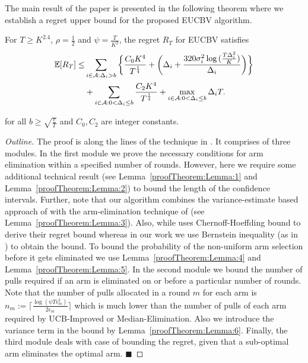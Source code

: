 The main result of the paper is presented in the following theorem where we establish a regret upper bound for the proposed EUCBV  algorithm. 
\begin{theorem}
\label{Result:Theorem:1}
For $T\geq K^{2.4}$, $\rho=\frac{1}{2}$ and $\psi=\frac{T}{K^2}$, the regret $R_T$ for EUCBV satisfies
\begin{align*}
\mathbb{E} [R_{T}] \leq &\sum\limits_{i\in \mathcal{A} :\Delta_{i} > b}\bigg\lbrace \dfrac{C_0 K^{4}}{T^{\frac{1}{4}}} + \bigg(\Delta_{i}+\dfrac{320\sigma_i^2\log{(\frac{T\Delta_{i}^{2}}{K})}}{\Delta_{i}}\bigg)\bigg \rbrace\\ 
  & +\sum\limits_{i\in \mathcal{A} :0 < \Delta_{i}\leq b} \dfrac{C_2 K^{4}}{T^{\frac{1}{4}}} + \max_{i\in \mathcal{A} :0 < \Delta_{i}\leq b}\Delta_{i}T.
\end{align*}

for all $b\geq\sqrt{\frac{e}{T}}$ and $C_0, C_2$ are integer constants. 
\end{theorem}

\begin{proof}[Outline]
The proof is along the lines of the technique in \citet{auer2010ucb}. It comprises of three modules. In the first module we prove the necessary conditions for arm elimination within a specified number of rounds. However, here we require some additional technical result (see Lemma~\ref{proofTheorem:Lemma:1} and Lemma~\ref{proofTheorem:Lemma:2}) to bound the length of the confidence intervals. Further, note that our algorithm combines the variance-estimate based approach of \citet{audibert2009exploration} with the arm-elimination technique of \citet{auer2010ucb} (see Lemma~\ref{proofTheorem:Lemma:3}). Also, while \citet{auer2010ucb} uses Chernoff-Hoeffding bound to derive their regret bound whereas in our work we use  Bernstein inequality (as in \citet{audibert2009exploration}) to obtain the bound. To bound the probability of the non-uniform arm selection before it gets eliminated we use Lemma~\ref{proofTheorem:Lemma:4} and Lemma~\ref{proofTheorem:Lemma:5}. In the second module we bound the number of pulls required if an arm is eliminated on or before a particular number of rounds. Note that the number of pulls allocated in a round $m$ for each arm is $n_{m}:=\bigg\lceil\frac{\log{(\psi T\epsilon_{m}^{2})}}{2\epsilon_{m}}\bigg\rceil$ which is much lower than the number of pulls of each arm required by UCB-Improved or Median-Elimination. Also we introduce the variance term in the bound by Lemma~\ref{proofTheorem:Lemma:6}. Finally, the third module deals with case of bounding the regret, given that a sub-optimal arm eliminates the optimal arm.
\hfill $\blacksquare$
\end{proof}

